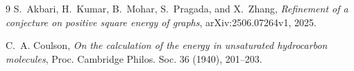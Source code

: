 \documentclass[11pt]{article}
\theoremstyle{remark}
\begin{document}
\begin{thebibliography}{9}
S.~Akbari, H.~Kumar, B.~Mohar, S.~Pragada, and X.~Zhang,
\emph{Refinement of a conjecture on positive square energy of graphs},
arXiv:2506.07264v1, 2025.

C.~A. Coulson,
\emph{On the calculation of the energy in unsaturated hydrocarbon molecules},
Proc. Cambridge Philos. Soc. 36 (1940), 201--203.
\end{thebibliography}
\end{document}
